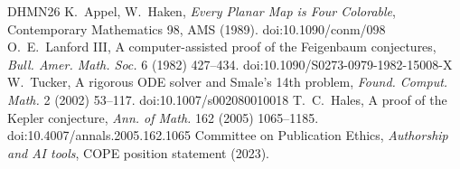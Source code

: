 \documentclass[11pt,a4paper]{article}
\begin{document}
\begin{thebibliography}{DHMN26}
 K.~Appel, W.~Haken, \emph{Every Planar Map is Four Colorable}, Contemporary Mathematics 98, AMS (1989). doi:10.1090/conm/098
 O.~E.~Lanford III, A computer-assisted proof of the Feigenbaum conjectures, \emph{Bull. Amer. Math. Soc.} 6 (1982) 427--434. doi:10.1090/S0273-0979-1982-15008-X
 W.~Tucker, A rigorous ODE solver and Smale's 14th problem, \emph{Found. Comput. Math.} 2 (2002) 53--117. doi:10.1007/s002080010018
 T.~C.~Hales, A proof of the Kepler conjecture, \emph{Ann. of Math.} 162 (2005) 1065--1185. doi:10.4007/annals.2005.162.1065
 Committee on Publication Ethics, \emph{Authorship and AI tools}, COPE position statement (2023).
\end{thebibliography}
\end{document}
